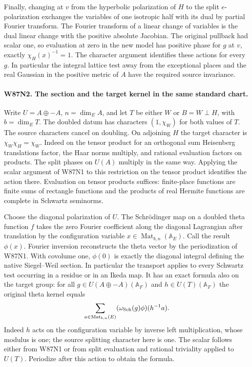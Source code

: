 Finally, changing at $v$ from the hyperbolic polarization of $H$
to the split $e$-polarization exchanges the variables of one
isotropic half with its dual by partial Fourier transform.
The Fourier transform of a linear change of variables is the dual
linear change with the positive absolute Jacobian. The original
pullback had scalar one, so evaluation at zero in the new model
has positive phase for $g$ at $v$, exactly $\chi_H(x)^{-1}=1$.
The character argument identifies these actions for every $g$.
In particular the integral lattice test away from the exceptional
places and the real Gaussian in the positive metric of $A$ have
the required source invariance.

\paragraph{W87N2. The section and the target kernel in the same standard chart.}
Write $U=A\oplus -A$, $n=\dim_E A$, and let $T$ be either
$W$ or $B=W\perp H$, with $b=\dim_E T$. The doubled datum has
characters $(1,\chi_W)$ for both values of $T$. The source
characters cancel on doubling. On adjoining $H$ the target
character is $\chi_W\chi_H=\chi_W$. Indeed on the tensor
product for an orthogonal sum Heisenberg translations factor, the
Haar norms multiply, and rational evaluation factors on products.
The split phases on $U(A)$ multiply in the same way. Applying the
scalar argument of W87N1 to this restriction on the tensor product
identifies the action there. Evaluation on tensor products suffices:
finite-place functions are finite sums of rectangle functions and
the products of real Hermite functions are complete in Schwartz
seminorms.

Choose the diagonal polarization of $U$. The Schr\"odinger map on
a doubled theta function $f$ takes the zero Fourier coefficient
along the diagonal Lagrangian after translation by the configuration
variable $x\in\operatorname{Mat}_{b,n}(\mathbb A_E)$. Call the
result $\phi(x)$. Fourier inversion reconstructs the theta vector
by the periodization of W87N1. With covolume one, $\phi(0)$ is
exactly the diagonal integral defining the native Siegel--Weil
section. In particular the transport applies to every Schwartz
test occurring in a residue or in an Ikeda map. It has an exact
formula also on the target group: for all $g\in U(A\oplus-A)(\mathbb A_F)$
and $h\in U(T)(\mathbb A_F)$ the original theta kernel equals
\[
       \sum_{a\in\operatorname{Mat}_{b,n}(E)}
                     (\omega_{\rm Sch}(g)\phi)(h^{-1}a).
\]
Indeed $h$ acts on the configuration variable by inverse
left multiplication, whose modulus is one; the source splitting
character here is one. The scalar follows either from W87N1 or
from split evaluation and rational triviality applied to $U(T)$.
Periodize after this action to obtain the formula.

